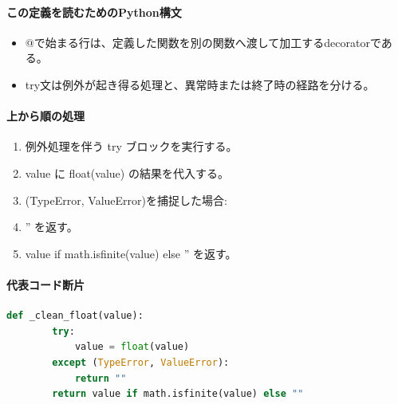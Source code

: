 \documentclass[a4paper,11pt]{article}
\begin{document}
            \paragraph{この定義を読むためのPython構文}
            \begin{itemize}[leftmargin=1.6em]
            \item @で始まる行は、定義した関数を別の関数へ渡して加工するdecoratorである。
\item try文は例外が起き得る処理と、異常時または終了時の経路を分ける。
            \end{itemize}
            \paragraph{上から順の処理}
            \begin{enumerate}[leftmargin=1.8em]
            \item 例外処理を伴う try ブロックを実行する。
\item   value に float(value) の結果を代入する。
\item   (TypeError, ValueError)を捕捉した場合:
\item   '' を返す。
\item value if math.isfinite(value) else '' を返す。
            \end{enumerate}
            \paragraph{代表コード断片}
            \begin{lstlisting}[language=Python]
    def _clean_float(value):
        try:
            value = float(value)
        except (TypeError, ValueError):
            return ""
        return value if math.isfinite(value) else ""
\end{lstlisting}
\end{document}
